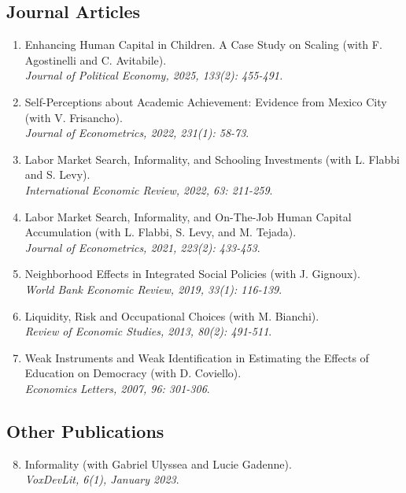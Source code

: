 \documentclass[12pt,english]{article}
\newcommand\reverselabel[1]{%
  \def\theenumi{}%
  \renewcommand\makelabel{\makebox[\dimexpr\labelwidth-3pt\relax][r]{%
    \the\numexpr#1-\value{enumi}+1\relax}}}%
\begin{document}
\subsection*{Journal Articles}
\begin{enumerate}
\reverselabel{7}
\item Enhancing Human Capital in Children. A Case Study on Scaling (with F. Agostinelli and C. Avitabile).\\ \textit{Journal of Political Economy, 2025, 133(2): 455-491.}
\item Self-Perceptions about Academic Achievement: Evidence from Mexico City (with V. Frisancho). \\
\textit{Journal of Econometrics, 2022, 231(1): 58-73}.  
\item  Labor Market Search, Informality, and Schooling Investments (with L. Flabbi and S. Levy). \\ \textit{International Economic Review, 2022, 63: 211-259}.  
\item  Labor Market Search, Informality, and On-The-Job Human Capital Accumulation (with L. Flabbi, S. Levy, and M. Tejada). \\ \textit{Journal of Econometrics, 2021, 223(2): 433-453}. 
\item Neighborhood Effects in Integrated Social Policies (with J. Gignoux). \\ \textit{World Bank Economic Review, 2019, 33(1): 116-139}.
\item Liquidity, Risk and Occupational Choices (with M. Bianchi). \\ \textit{Review of Economic Studies, 2013, 80(2): 491-511}.
\item Weak Instruments and Weak Identification in Estimating the Effects of Education on Democracy (with D. Coviello).\\ \textit{Economics Letters, 2007, 96: 301-306}.
\end{enumerate}


\subsection*{Other Publications}
\begin{enumerate}
\setcounter{enumi}{7}
\item Informality (with Gabriel Ulyssea and Lucie Gadenne). \\
\textit{VoxDevLit, 6(1), January 2023}.
\end{enumerate}
\end{document}
